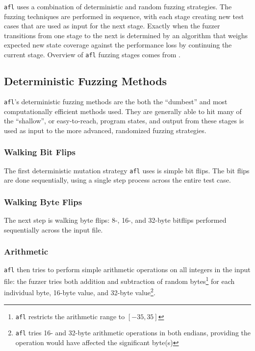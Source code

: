 \texttt{afl} uses a combination of deterministic and random fuzzing strategies.
The fuzzing techniques are performed in sequence, with each stage
creating new test cases that are used as input for the next stage. Exactly
when the fuzzer transitions from one stage to the next is determined by an
algorithm that weighs expected new state coverage against the performance
loss by continuing the current stage. Overview of \texttt{afl} fuzzing
stages comes from \cite{afl-fuzzing-blogpost}.

\subsection{Deterministic Fuzzing Methods}


\texttt{afl}'s deterministic fuzzing methods are the both the ``dumbest''
and most computationally efficient methods used. They are
generally able to hit many of the ``shallow'', or easy-to-reach, program states,
and output from these stages is used as input to the more advanced, randomized
fuzzing strategies.

\subsubsection{Walking Bit Flips}

The first deterministic mutation strategy \texttt{afl} uses is simple bit
flips. The bit flips are done sequentially, using a single step process across 
the entire test case.

\subsubsection{Walking Byte Flips}

The next step is walking byte flips: 8-, 16-, and 32-byte bitflips performed
sequentially across the input file.

\subsubsection{Arithmetic}

\texttt{afl} then tries to perform simple arithmetic operations
on all integers in the input file: the fuzzer tries both addition and
subtraction of random bytes\footnote{\texttt{afl} restricts the arithmetic range to $[-35, 35]$\cite{afl-whitepaper}} for each
individual byte, 16-byte value, and 32-byte value\footnote{\texttt{afl} tries 16- and 32-byte arithmetic operations in both endians, providing the operation would have affected the significant byte(s)\cite{afl-whitepaper}}.

